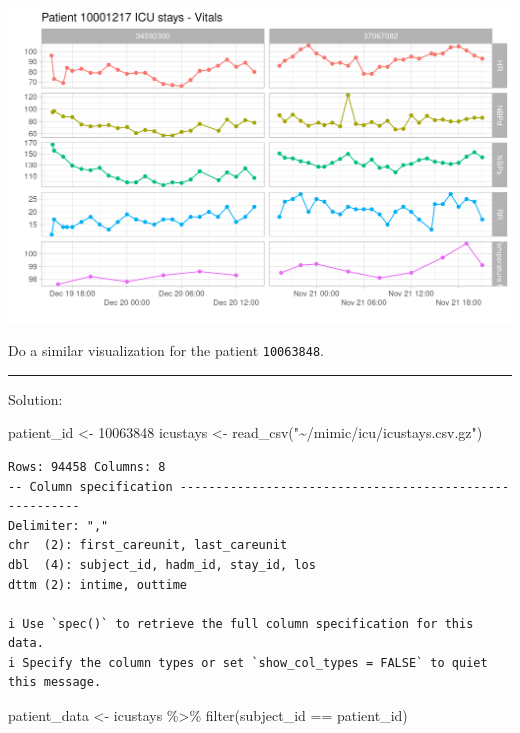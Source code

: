 \documentclass[
]{article}
\newenvironment{Shaded}{\begin{snugshade}}{\end{snugshade}}
\newcommand{\DecValTok}[1]{\textcolor[rgb]{0.00,0.00,0.81}{#1}}
\newcommand{\FunctionTok}[1]{\textcolor[rgb]{0.00,0.00,0.00}{#1}}
\newcommand{\NormalTok}[1]{\textcolor[rgb]{0.00,0.00,0.00}{#1}}
\newcommand{\OtherTok}[1]{\textcolor[rgb]{0.56,0.35,0.01}{#1}}
\newcommand{\SpecialCharTok}[1]{\textcolor[rgb]{0.00,0.00,0.00}{#1}}
\newcommand{\StringTok}[1]{\textcolor[rgb]{0.31,0.60,0.02}{#1}}
\begin{document}
\includegraphics{images/10001217_icu.png}

Do a similar visualization for the patient \texttt{10063848}.

\begin{center}\rule{0.5\linewidth}{0.5pt}\end{center}

Solution:

\begin{Shaded}
\begin{Highlighting}[]
\NormalTok{patient\_id }\OtherTok{\textless{}{-}} \DecValTok{10063848}
\NormalTok{icustays }\OtherTok{\textless{}{-}} \FunctionTok{read\_csv}\NormalTok{(}\StringTok{"\textasciitilde{}/mimic/icu/icustays.csv.gz"}\NormalTok{)}
\end{Highlighting}
\end{Shaded}

\begin{verbatim}
Rows: 94458 Columns: 8
-- Column specification --------------------------------------------------------
Delimiter: ","
chr  (2): first_careunit, last_careunit
dbl  (4): subject_id, hadm_id, stay_id, los
dttm (2): intime, outtime

i Use `spec()` to retrieve the full column specification for this data.
i Specify the column types or set `show_col_types = FALSE` to quiet this message.
\end{verbatim}

\begin{Shaded}
\begin{Highlighting}[]
\NormalTok{patient\_data }\OtherTok{\textless{}{-}}\NormalTok{ icustays }\SpecialCharTok{\%\textgreater{}\%} \FunctionTok{filter}\NormalTok{(subject\_id }\SpecialCharTok{==}\NormalTok{ patient\_id)}
\end{Highlighting}
\end{Shaded}
\end{document}
